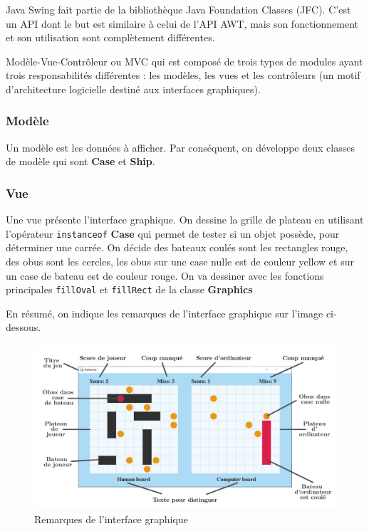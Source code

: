 \documentclass[12pt, pdflatex]{article}
\begin{document}
    Java Swing\cite{swing} fait partie de la bibliothèque Java Foundation Classes (JFC). C'est un API dont le but est similaire à celui de l'API AWT, mais son fonctionnement et son utilisation sont complètement différentes.

    Modèle-Vue-Contrôleur ou MVC\cite{mvc} qui est composé de trois types de modules ayant trois responsabilités différentes : les modèles, les vues et les contrôleurs (un motif d'architecture logicielle destiné aux interfaces graphiques).

        \subsubsection{Modèle}
        Un modèle est les données à afficher. Par conséquent, on développe deux classes de modèle qui sont \textbf{Case} et \textbf{Ship}.

        \subsubsection{Vue}
        Une vue présente l'interface graphique. On dessine la grille de plateau en utilisant l'opérateur \texttt{instanceof} \textbf{Case} qui permet de tester si un objet possède, pour déterminer une carrée. On décide des bateaux coulés sont les rectangles rouge, des obus sont les cercles, les obus sur une case nulle est de couleur yellow et sur un case de bateau est de couleur rouge. On va dessiner avec les fonctions principales \texttt{fillOval} et \texttt{fillRect} de la classe \textbf{Graphics}

        En résumé, on indique les remarques de l'interface graphique sur l'image ci-dessous.
        \begin{figure}[H]
            \centering
            \includegraphics[width=1\textwidth]{sources/note.pdf}
            \caption{Remarques de l'interface graphique}
        \end{figure}
\end{document}
